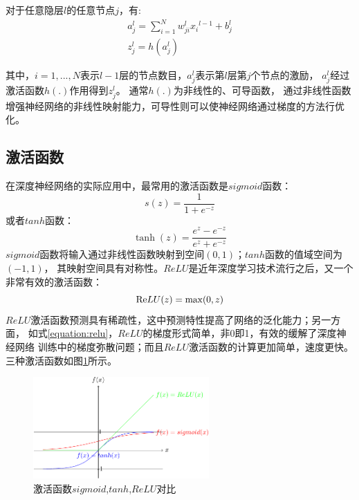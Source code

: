 对于任意隐层$l$的任意节点$j$，有:
\[\begin{array}{l}
a_j^l = \sum\limits_{i = 1}^N {w_{ji}^l {x_i}^{l-1}+ b_j^l} \\
z_j^l = h(a_j^l)
\end{array}\]

其中，$i = 1,...,N$表示$l-1$层的节点数目，$a_j^l$表示第$l$层第$j$个节点的激励，
$a_j^l$经过激活函数$h(.)$作用得到$z_j^l$。
通常$h(.)$为非线性的、可导函数，
通过非线性函数增强神经网络的非线性映射能力，可导性则可以使神经网络通过梯度的方法行优化。

\subsection{激活函数}

在深度神经网络的实际应用中，最常用的激活函数是$sigmoid$函数：
\begin{equation}
s(z) = \frac{1}{{1 + {e^{ - z}}}}
\end{equation}
或者$tanh$函数：
\begin{equation}
\tanh (z) = \frac{{{e^z} - {e^{ - z}}}}{{{e^z} + {e^{ - z}}}}
\end{equation}
$sigmoid$函数将输入通过非线性函数映射到空间$(0,1)$；$tanh$函数的值域空间为$(-1,1)$，
其映射空间具有对称性。$ReLU$是近年深度学习技术流行之后，又一个非常有效的激活函数：
\begin{equation} \label{equation:relu}
{\mathop{\rm Re}\nolimits} LU(z) = \max (0,z)
\end{equation}
$ReLU$激活函数预测具有稀疏性，这中预测特性提高了网络的泛化能力；另一方面，
如式\ref{equation:relu}，$ReLU$的梯度形式简单，非0即1，有效的缓解了深度神经网络
训练中的梯度弥散问题；而且$ReLU$激活函数的计算更加简单，速度更快。
三种激活函数如图\ref{fig:activation}所示。

\begin{figure}[htbp]
\centering
\includegraphics[width=0.6\textwidth]{figures/chapter3/activation-crop}
\caption{激活函数$sigmoid$,$tanh$,$ReLU$对比}
\label{fig:activation}
\end{figure}

